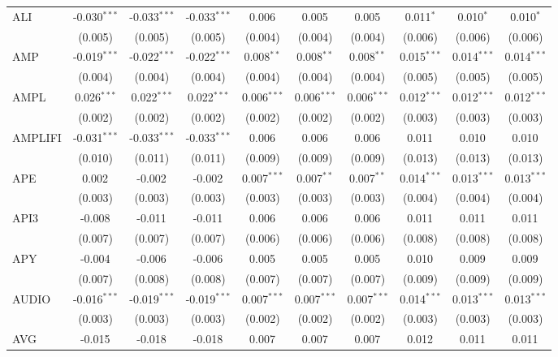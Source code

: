 \begin{table}[!htbp]
\begin{tabular}{@{\extracolsep{5pt}}lccccccccc}
 ALI & -0.030$^{***}$ & -0.033$^{***}$ & -0.033$^{***}$ & 0.006$^{}$ & 0.005$^{}$ & 0.005$^{}$ & 0.011$^{*}$ & 0.010$^{*}$ & 0.010$^{*}$ \\
  & (0.005) & (0.005) & (0.005) & (0.004) & (0.004) & (0.004) & (0.006) & (0.006) & (0.006) \\
 AMP & -0.019$^{***}$ & -0.022$^{***}$ & -0.022$^{***}$ & 0.008$^{**}$ & 0.008$^{**}$ & 0.008$^{**}$ & 0.015$^{***}$ & 0.014$^{***}$ & 0.014$^{***}$ \\
  & (0.004) & (0.004) & (0.004) & (0.004) & (0.004) & (0.004) & (0.005) & (0.005) & (0.005) \\
 AMPL & 0.026$^{***}$ & 0.022$^{***}$ & 0.022$^{***}$ & 0.006$^{***}$ & 0.006$^{***}$ & 0.006$^{***}$ & 0.012$^{***}$ & 0.012$^{***}$ & 0.012$^{***}$ \\
  & (0.002) & (0.002) & (0.002) & (0.002) & (0.002) & (0.002) & (0.003) & (0.003) & (0.003) \\
 AMPLIFI & -0.031$^{***}$ & -0.033$^{***}$ & -0.033$^{***}$ & 0.006$^{}$ & 0.006$^{}$ & 0.006$^{}$ & 0.011$^{}$ & 0.010$^{}$ & 0.010$^{}$ \\
  & (0.010) & (0.011) & (0.011) & (0.009) & (0.009) & (0.009) & (0.013) & (0.013) & (0.013) \\
 APE & 0.002$^{}$ & -0.002$^{}$ & -0.002$^{}$ & 0.007$^{***}$ & 0.007$^{**}$ & 0.007$^{**}$ & 0.014$^{***}$ & 0.013$^{***}$ & 0.013$^{***}$ \\
  & (0.003) & (0.003) & (0.003) & (0.003) & (0.003) & (0.003) & (0.004) & (0.004) & (0.004) \\
 API3 & -0.008$^{}$ & -0.011$^{}$ & -0.011$^{}$ & 0.006$^{}$ & 0.006$^{}$ & 0.006$^{}$ & 0.011$^{}$ & 0.011$^{}$ & 0.011$^{}$ \\
  & (0.007) & (0.007) & (0.007) & (0.006) & (0.006) & (0.006) & (0.008) & (0.008) & (0.008) \\
 APY & -0.004$^{}$ & -0.006$^{}$ & -0.006$^{}$ & 0.005$^{}$ & 0.005$^{}$ & 0.005$^{}$ & 0.010$^{}$ & 0.009$^{}$ & 0.009$^{}$ \\
  & (0.007) & (0.008) & (0.008) & (0.007) & (0.007) & (0.007) & (0.009) & (0.009) & (0.009) \\
 AUDIO & -0.016$^{***}$ & -0.019$^{***}$ & -0.019$^{***}$ & 0.007$^{***}$ & 0.007$^{***}$ & 0.007$^{***}$ & 0.014$^{***}$ & 0.013$^{***}$ & 0.013$^{***}$ \\
  & (0.003) & (0.003) & (0.003) & (0.002) & (0.002) & (0.002) & (0.003) & (0.003) & (0.003) \\
 AVG & -0.015$^{}$ & -0.018$^{}$ & -0.018$^{}$ & 0.007$^{}$ & 0.007$^{}$ & 0.007$^{}$ & 0.012$^{}$ & 0.011$^{}$ & 0.011$^{}$ \\

\end{tabular}
\end{table}
